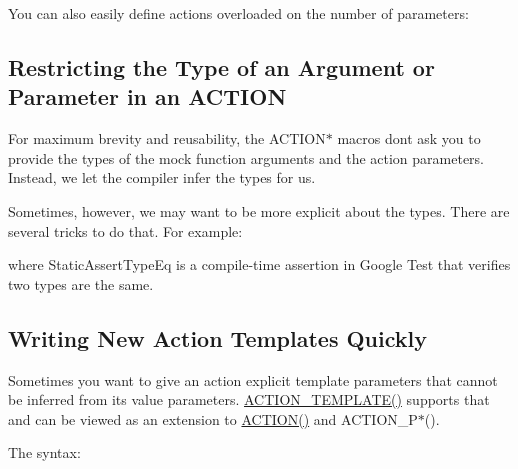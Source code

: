 You can also easily define actions overloaded on the number of parameters\+: 
\begin{DoxyCode}{0}
\end{DoxyCode}


\subsection*{Restricting the Type of an Argument or Parameter in an A\+C\+T\+I\+ON}

For maximum brevity and reusability, the {\ttfamily A\+C\+T\+I\+O\+N$\ast$} macros don\textquotesingle{}t ask you to provide the types of the mock function arguments and the action parameters. Instead, we let the compiler infer the types for us.

Sometimes, however, we may want to be more explicit about the types. There are several tricks to do that. For example\+: 
\begin{DoxyCode}{0}
\DoxyCodeLine{\}}
\DoxyCodeLine{}
\DoxyCodeLine{}
\DoxyCodeLine{\}}
\end{DoxyCode}
 where {\ttfamily Static\+Assert\+Type\+Eq} is a compile-\/time assertion in Google Test that verifies two types are the same.

\subsection*{Writing New Action Templates Quickly}

Sometimes you want to give an action explicit template parameters that cannot be inferred from its value parameters. {\ttfamily \mbox{\hyperlink{gmock-generated-actions_8h_ad04fa741f313f0c23924d61fcfb1536d}{A\+C\+T\+I\+O\+N\+\_\+\+T\+E\+M\+P\+L\+A\+T\+E()}}} supports that and can be viewed as an extension to {\ttfamily \mbox{\hyperlink{gmock-generated-actions_8h_a7af7137aa4871df4235881af377205fe}{A\+C\+T\+I\+O\+N()}}} and {\ttfamily A\+C\+T\+I\+O\+N\+\_\+\+P$\ast$()}.

The syntax\+: 
\begin{DoxyCode}{0}
\end{DoxyCode}


